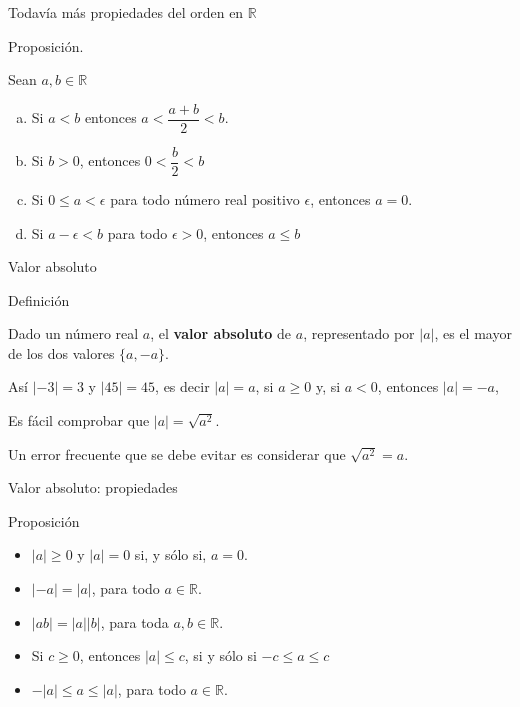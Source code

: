 \documentclass[ignorenonframetext,]{beamer}
\providecommand{\tightlist}{%
  \setlength{\itemsep}{0pt}\setlength{\parskip}{0pt}}
\begin{document}
\begin{frame}{Todavía más propiedades del orden en \(\mathbb{R}\)}
\protect\hypertarget{todavuxeda-muxe1s-propiedades-del-orden-en-mathbbr}{}

Proposición.

Sean \(a,b \in \mathbb{R}\)

\begin{enumerate}
[a)]
\tightlist
\item
  Si \(a < b\) entonces \(a < \dfrac{a+b}{2} <b\).
\item
  Si \(b>0\), entonces \(0<\dfrac{b}{2} < b\)
\item
  Si \(0\leq a < \epsilon\) para todo número real positivo \(\epsilon\),
  entonces \(a=0\).
\item
  Si \(a-\epsilon < b\) para todo \(\epsilon > 0\), entonces \(a\leq b\)
\end{enumerate}

\end{frame}

\begin{frame}{Valor absoluto}
\protect\hypertarget{valor-absoluto}{}

Definición

Dado un número real \(a\), el \textbf{valor absoluto} de \(a\),
representado por \(|a|\), es el mayor de los dos valores \(\{a,-a \}\).

Así \(|-3|=3\) y \(|45|=45\), es decir \(|a| = a\), si \(a \geq 0\) y,
si \(a <0\), entonces \(|a| = -a\),

Es fácil comprobar que \(|a| = \sqrt{a^2}\).

Un error frecuente que se debe evitar es considerar que
\(\sqrt{a^2}=a\).

\end{frame}

\begin{frame}{Valor absoluto: propiedades}
\protect\hypertarget{valor-absoluto-propiedades}{}

Proposición

\begin{itemize}
\tightlist
\item
  \(|a| \geq 0\) y \(|a|=0\) si, y sólo si, \(a=0\).
\item
  \(|-a|=|a|\), para todo \(a \in \mathbb{R}\).
\item
  \(|ab|= |a||b|\), para toda \(a,b \in \mathbb{R}\).
\item
  Si \(c \geq 0\), entonces \(|a| \leq c\), si y sólo si
  \(-c \leq a \leq c\)
\item
  \(-|a| \leq a \leq |a|\), para todo \(a \in \mathbb{R}\).
\end{itemize}

\end{frame}
\end{document}
